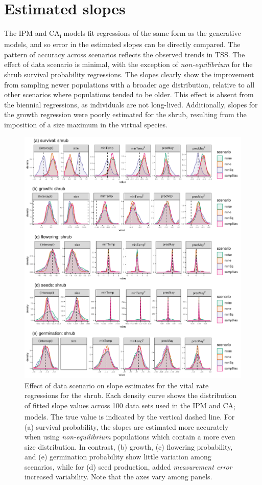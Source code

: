 \documentclass[]{article}
\begin{document}
\clearpage
\section{Estimated slopes}

The IPM and CA\textsubscript{i} models fit regressions of the same form
as the generative models, and so error in the estimated slopes can be
directly compared. The pattern of accuracy across scenarios reflects the
observed trends in TSS. The effect of data scenario is minimal, with the
exception of \emph{non-equilibrium} for the shrub survival probability
regressions. The slopes clearly show the improvement from sampling newer
populations with a broader age distribution, relative to all other
scenarios where populations tended to be older. This effect is absent
from the biennial regressions, as individuals are not long-lived.
Additionally, slopes for the growth regression were poorly estimated for
the shrub, resulting from the imposition of a size maximum in the
virtual species.

\begin{figure}
    \centering\includegraphics[width=\linewidth]{../../figs/diag/slope_dens_shrub.pdf}
    \caption{\label{fig:slopesShrub} Effect of data scenario on slope estimates for the vital rate regressions for the shrub. Each density curve shows the distribution of fitted slope values across 100 data sets used in the IPM and CA\textsubscript{i} models. The true value is indicated by the vertical dashed line. For (a) survival probability, the slopes are estimated more accurately when using \emph{non-equilibrium} populations which contain a more even size distribution. In contrast, (b) growth, (c) flowering probability, and (e) germination probability show little variation among scenarios, while for (d) seed production, added \emph{measurement error} increased variability. Note that the axes vary among panels.}
\end{figure}
\end{document}
